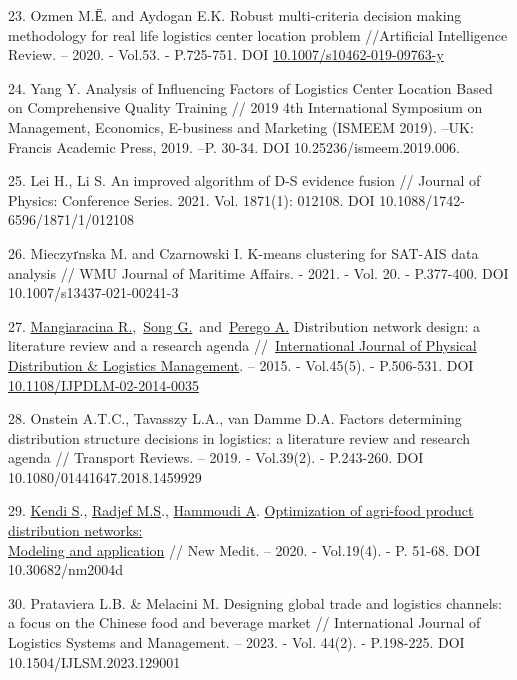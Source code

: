 \begin{references}
23. Ozmen M.Ё. and Aydogan E.K. Robust multi-criteria decision making
methodology for real life logistics center location problem
//Artificial Intelligence Review. -- 2020. - Vol.53. - P.725-751. DOI
\href{https://link.springer.com/article/10.1007/s10462-019-09763-y}{10.1007/s10462-019-09763-y}

24. Yang Y. Analysis of Influencing Factors of Logistics Center Location
Based on Comprehensive Quality Training // 2019 4th International
Symposium on Management, Economics, E-business and Marketing (ISMEEM
2019). --UK: Francis Academic Press, 2019. --P. 30-34. DOI
10.25236/ismeem.2019.006.

25. Lei H., Li S. An improved algorithm of D-S evidence fusion // Journal
of Physics: Conference Series. 2021. Vol. 1871(1): 012108. DOI
10.1088/1742-6596/1871/1/012108

26. Mieczyґnska M. and Czarnowski I. K-means clustering for SAT-AIS data
analysis // WMU Journal of Maritime Affairs. - 2021. - Vol. 20. -
P.377-400. DOI 10.1007/s13437-021-00241-3

27. \href{https://www.emerald.com/insight/search?q=Riccardo\%20Mangiaracina}{Mangiaracina
R.},~\href{https://www.emerald.com/insight/search?q=Guang\%20Song}{Song
G.}~and~\href{https://www.emerald.com/insight/search?q=Alessandro\%20Perego}{Perego
A.} Distribution network design: a literature review and a research
agenda
//~\href{https://www.emerald.com/insight/publication/issn/0960-0035}{International
Journal of Physical Distribution \& Logistics Management}. -- 2015. -
Vol.45(5). - P.506-531. DOI
\href{http://dx.doi.org/10.1108/IJPDLM-02-2014-0035}{10.1108/IJPDLM-02-2014-0035}

28. Onstein A.T.C., Tavasszy L.A., van Damme D.A. Factors determining
distribution structure decisions in logistics: a literature review and
research agenda // Transport Reviews. -- 2019. - Vol.39(2). -
P.243-260. DOI 10.1080/01441647.2018.1459929

29. \href{https://www.webofscience.com/wos/author/record/24657901}{Kendi
S}.,
\href{https://www.webofscience.com/wos/author/record/13850822}{Radjef
M.S}.,
\href{https://www.webofscience.com/wos/author/record/29644444}{Hammoudi
A}.
\href{https://www.webofscience.com/wos/woscc/full-record/WOS:000598477800004}{Optimization
of agri-food product distribution networks: \\Modeling and application}
// New Medit. -- 2020. - Vol.19(4). - P. 51-68. DOI 10.30682/nm2004d

30. Prataviera L.B. \& Melacini M. Designing global trade and logistics
channels: a focus on the Chinese food and beverage market //
International Journal of Logistics Systems and Management. -- 2023. -
Vol. 44(2). - P.198-225. DOI 10.1504/IJLSM.2023.129001


\end{references}
